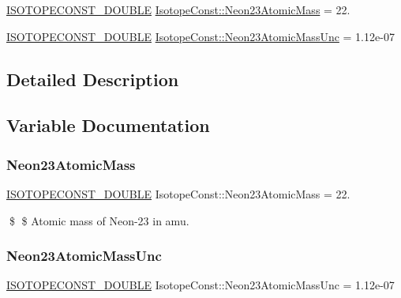 \begin{DoxyCompactItemize}
\item 
\mbox{\hyperlink{group___isotope_const-_macros_ga8f45a7272ce02c0b4c65c44636ed719a}{I\+S\+O\+T\+O\+P\+E\+C\+O\+N\+S\+T\+\_\+\+D\+O\+U\+B\+LE}} \mbox{\hyperlink{group___isotope_const-_neon-_ne23_gadbc2a0a1cd7a654032c389438b784824}{Isotope\+Const\+::\+Neon23\+Atomic\+Mass}} = 22.
\item 
\mbox{\hyperlink{group___isotope_const-_macros_ga8f45a7272ce02c0b4c65c44636ed719a}{I\+S\+O\+T\+O\+P\+E\+C\+O\+N\+S\+T\+\_\+\+D\+O\+U\+B\+LE}} \mbox{\hyperlink{group___isotope_const-_neon-_ne23_ga4c7cfb05f95f7d077c63f4cd150e02bf}{Isotope\+Const\+::\+Neon23\+Atomic\+Mass\+Unc}} = 1.\+12e-\/07
\end{DoxyCompactItemize}


\subsection{Detailed Description}


\subsection{Variable Documentation}
\mbox{\label{group___isotope_const-_neon-_ne23_gadbc2a0a1cd7a654032c389438b784824}} 
\subsubsection{\texorpdfstring{Neon23\+Atomic\+Mass}{Neon23AtomicMass}}
{\footnotesize\ttfamily \mbox{\hyperlink{group___isotope_const-_macros_ga8f45a7272ce02c0b4c65c44636ed719a}{I\+S\+O\+T\+O\+P\+E\+C\+O\+N\+S\+T\+\_\+\+D\+O\+U\+B\+LE}} Isotope\+Const\+::\+Neon23\+Atomic\+Mass = 22.}

\$ \$ Atomic mass of Neon-\/23 in amu. \mbox{\label{group___isotope_const-_neon-_ne23_ga4c7cfb05f95f7d077c63f4cd150e02bf}} 
\subsubsection{\texorpdfstring{Neon23\+Atomic\+Mass\+Unc}{Neon23AtomicMassUnc}}
{\footnotesize\ttfamily \mbox{\hyperlink{group___isotope_const-_macros_ga8f45a7272ce02c0b4c65c44636ed719a}{I\+S\+O\+T\+O\+P\+E\+C\+O\+N\+S\+T\+\_\+\+D\+O\+U\+B\+LE}} Isotope\+Const\+::\+Neon23\+Atomic\+Mass\+Unc = 1.\+12e-\/07}

